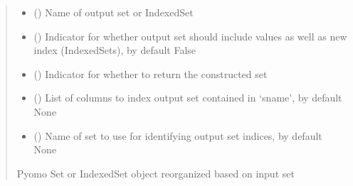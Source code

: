 \documentclass[letterpaper,10pt,english]{sphinxmanual}
\begin{document}
\begin{fulllineitems}
\begin{fulllineitems}
\begin{quote}
\begin{description}
\begin{itemize}
\item {} 
\sphinxAtStartPar
{} () \textendash{} Name of output set or IndexedSet

\item {} 
\sphinxAtStartPar
{} (\sphinxstyleliteralemphasis{\sphinxupquote{ | }}\sphinxstyleliteralemphasis{\sphinxupquote{, }}) \textendash{} Indicator for whether output set should include values as well as new index (IndexedSets), by default False

\item {} 
\sphinxAtStartPar
{} (\sphinxstyleliteralemphasis{\sphinxupquote{ | }}\sphinxstyleliteralemphasis{\sphinxupquote{, }}) \textendash{} Indicator for whether to return the constructed set

\item {} 
\sphinxAtStartPar
{} (\sphinxstyleliteralemphasis{\sphinxupquote{{[}}}\sphinxstyleliteralemphasis{\sphinxupquote{{]} }}\sphinxstyleliteralemphasis{\sphinxupquote{| }}\sphinxstyleliteralemphasis{\sphinxupquote{, }}) \textendash{} List of columns to index output set contained in ‘sname’, by default None

\item {} 
\sphinxAtStartPar
{} (\sphinxstyleliteralemphasis{\sphinxupquote{ | }}\sphinxstyleliteralemphasis{\sphinxupquote{, }}) \textendash{} Name of set to use for identifying output set indices, by default None

\end{itemize}

\sphinxAtStartPar
Pyomo Set or IndexedSet object reorganized based on input set


\end{description}
\end{quote}
\end{fulllineitems}
\end{fulllineitems}
\end{document}
